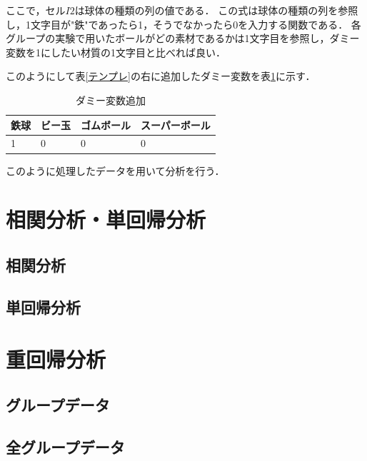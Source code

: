 \documentclass[titlepage,a4paper]{jsarticle}
\begin{document}
ここで，セル$I2$は球体の種類の列の値である．
この式は球体の種類の列を参照し，1文字目が"鉄"であったら1，そうでなかったら0を入力する関数である．
各グループの実験で用いたボールがどの素材であるかは1文字目を参照し，ダミー変数を1にしたい材質の1文字目と比べれば良い．

このようにして表\ref{テンプレ}の右に追加したダミー変数を表\ref{ダミー}に示す．
\begin{table}[H]
  \centering
  \caption{ダミー変数追加}
  \label{ダミー}
  \begin{tabular}{llll}
    鉄球 & ビー玉 & ゴムボール & スーパーボール \\\hline\hline
    1  & 0   & 0     & 0       \\\hline
  \end{tabular}
\end{table}

このように処理したデータを用いて分析を行う．


\section{相関分析・単回帰分析}

\subsection{相関分析}
\subsection{単回帰分析}

\section{重回帰分析}
\subsection{グループデータ}

\subsection{全グループデータ}
\end{document}
